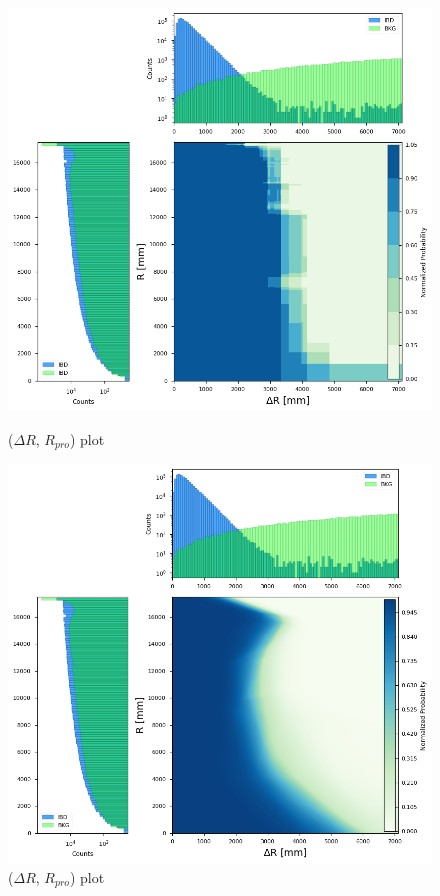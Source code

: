 \vspace{-0.5cm}
\begin{figure}[h!]
	\centering
	\begin{minipage}{0.5\textwidth}
		\centering
		\includegraphics[width=0.9\linewidth]{Images/dr_r_xgboost}
		\caption{($\Delta R$, $R_{pro}$) plot}
		\label{fig:dr_r_xgboost}
	\end{minipage}%
	\begin{minipage}{0.5\textwidth}
		\centering
		\includegraphics[width=0.9\linewidth]{Images/dr_r_pytorch}
		\caption{($\Delta R$, $R_{pro}$) plot}
		\label{fig:dr_r_pytorch}
	\end{minipage}

\end{figure}



